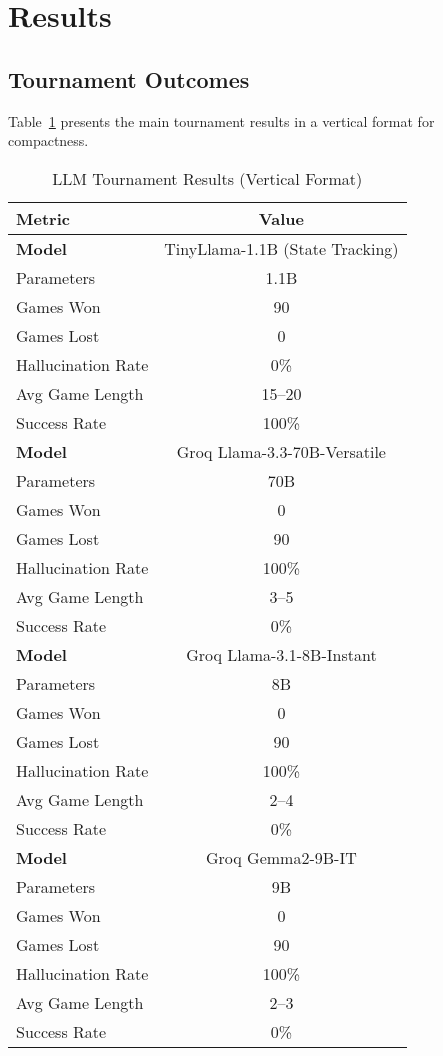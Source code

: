 \documentclass[conference]{IEEEtran}
\begin{document}
\section{Results}
\subsection{Tournament Outcomes}
Table~\ref{tab:llm_tournament_results_vertical} presents the main tournament results in a vertical format for compactness.

\begin{table}[htbp]
\scriptsize
\renewcommand{\arraystretch}{1.1}
\caption{LLM Tournament Results (Vertical Format)}
\label{tab:llm_tournament_results_vertical}
\centering
\begin{tabular}{|l|c|}
\hline
\textbf{Metric} & \textbf{Value} \\
\hline
\textbf{Model} & TinyLlama-1.1B (State Tracking) \\
Parameters & 1.1B \\
Games Won & 90 \\
Games Lost & 0 \\
Hallucination Rate & 0\% \\
Avg Game Length & 15--20 \\
Success Rate & 100\% \\
\hline
\textbf{Model} & Groq Llama-3.3-70B-Versatile \\
Parameters & 70B \\
Games Won & 0 \\
Games Lost & 90 \\
Hallucination Rate & 100\% \\
Avg Game Length & 3--5 \\
Success Rate & 0\% \\
\hline
\textbf{Model} & Groq Llama-3.1-8B-Instant \\
Parameters & 8B \\
Games Won & 0 \\
Games Lost & 90 \\
Hallucination Rate & 100\% \\
Avg Game Length & 2--4 \\
Success Rate & 0\% \\
\hline
\textbf{Model} & Groq Gemma2-9B-IT \\
Parameters & 9B \\
Games Won & 0 \\
Games Lost & 90 \\
Hallucination Rate & 100\% \\
Avg Game Length & 2--3 \\
Success Rate & 0\% \\
\hline
\end{tabular}
\renewcommand{\arraystretch}{1}
\end{table}
\end{document}
